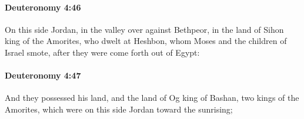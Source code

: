		\paragraph{Deuteronomy 4:46} %
			\label{DEUTERONOMY-4-46}

			On this side Jordan, in the valley over against Bethpeor, in the land of Sihon king of the Amorites, who dwelt at Heshbon, whom Moses and the children of Israel smote, after they were come forth out of Egypt:


		\paragraph{Deuteronomy 4:47} %
			\label{DEUTERONOMY-4-47}

			And they possessed his land, and the land of Og king of Bashan, two kings of the Amorites, which were on this side Jordan toward the sunrising;

